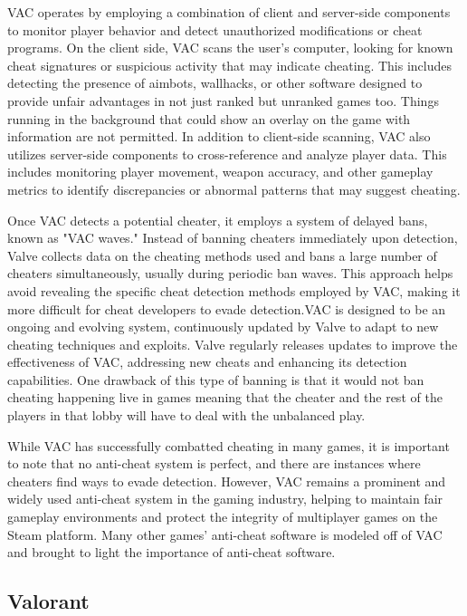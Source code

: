 \documentclass{article}
\theoremstyle{theorem}
\theoremstyle{definition}
\theoremstyle{remark}
\begin{document}
\medskip\indent
VAC operates by employing a combination of client and server-side components to monitor player behavior and detect unauthorized modifications or cheat programs. On the client side, VAC scans the user's computer, looking for known cheat signatures or suspicious activity that may indicate cheating. This includes detecting the presence of aimbots, wallhacks, or other software designed to provide unfair advantages in not just ranked but unranked games too. Things running in the background that could show an overlay on the game with information are not permitted. In addition to client-side scanning, VAC also utilizes server-side components to cross-reference and analyze player data. This includes monitoring player movement, weapon accuracy, and other gameplay metrics to identify discrepancies or abnormal patterns that may suggest cheating.

\medskip\indent
Once VAC detects a potential cheater, it employs a system of delayed bans, known as "VAC waves." Instead of banning cheaters immediately upon detection, Valve collects data on the cheating methods used and bans a large number of cheaters simultaneously, usually during periodic ban waves. This approach helps avoid revealing the specific cheat detection methods employed by VAC, making it more difficult for cheat developers to evade detection.VAC is designed to be an ongoing and evolving system, continuously updated by Valve to adapt to new cheating techniques and exploits. Valve regularly releases updates to improve the effectiveness of VAC, addressing new cheats and enhancing its detection capabilities. One drawback of this type of banning is that it would not ban cheating happening live in games meaning that the cheater and the rest of the players in that lobby will have to deal with the unbalanced play.

\medskip\indent
While VAC has successfully combatted cheating in many games, it is important to note that no anti-cheat system is perfect, and there are instances where cheaters find ways to evade detection. However, VAC remains a prominent and widely used anti-cheat system in the gaming industry, helping to maintain fair gameplay environments and protect the integrity of multiplayer games on the Steam platform. Many other games’ anti-cheat software is modeled off of VAC and brought to light the importance of anti-cheat software.

\subsection{Valorant}
\end{document}
